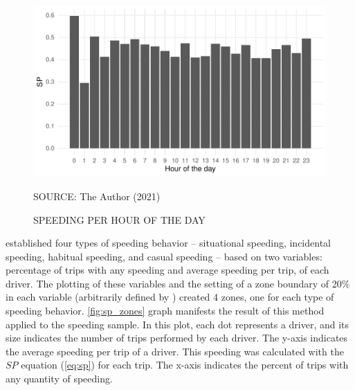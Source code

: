 \begin{figure}[!htbp]
    \centering\footnotesize
    \captionsetup{font=footnotesize}
    \caption{SPEEDING PER HOUR OF THE DAY}
    \includegraphics{fig/hotd_sp.pdf}
    \label{fig:hotd_sp}
    \par SOURCE: The Author (2021)
\end{figure}


\textcite{Richard2013a} established four types of speeding behavior – situational speeding, incidental speeding, habitual speeding, and casual speeding – based on two variables: percentage of trips with any speeding and average speeding per trip, of each driver. The plotting of these variables and the setting of a zone boundary of 20\% in each variable (arbitrarily defined by \textcite{Richard2013a}) created 4 zones, one for each type of speeding behavior. \autoref{fig:sp_zones} graph manifests the result of this method applied to the speeding sample. In this plot, each dot represents a driver, and its size indicates the number of trips performed by each driver. The y-axis indicates the average speeding per trip of a driver. This speeding was calculated with the $SP$ equation (\ref{eq:sp}) for each trip. The x-axis indicates the percent of trips with any quantity of speeding.

